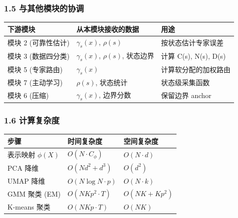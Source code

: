\documentclass[
  12pt,
]{ctexart}
\begin{document}
\subsubsection{1.5
与其他模块的协调}\label{ux4e0eux5176ux4ed6ux6a21ux5757ux7684ux534fux8c03}

\begin{longtable}[]{@{}
  >{\raggedright\arraybackslash}p{}
  >{\raggedright\arraybackslash}p{}
  >{\raggedright\arraybackslash}p{}@{}}
\toprule\noalign{}
\begin{minipage}[b]{\linewidth}\raggedright
下游模块
\end{minipage} & \begin{minipage}[b]{\linewidth}\raggedright
从本模块接收的数据
\end{minipage} & \begin{minipage}[b]{\linewidth}\raggedright
用途
\end{minipage} \\
\midrule\noalign{}
\endhead
\bottomrule\noalign{}
\endlastfoot
模块 2 (可靠性估计) & \(\gamma_s(x)\), \(\rho(s)\) &
按状态估计专家误差 \\
模块 3 (数据四分类) & \(\gamma_s(x)\), \(\rho(s)\), 状态边界 & 计算
C(s), N(s), D(s) \\
模块 5 (专家路由) & \(\gamma_s(x)\) & 计算软分配的加权路由 \\
模块 7 (主动学习) & \(\rho(s)\), 状态统计 & 状态级采集函数 \\
模块 6 (压缩) & \(\gamma_s(x)\), 边界分数 & 保留边界 anchor \\
\end{longtable}

\subsubsection{1.6 计算复杂度}\label{ux8ba1ux7b97ux590dux6742ux5ea6}

\begin{longtable}[]{@{}lll@{}}
\toprule\noalign{}
步骤 & 时间复杂度 & 空间复杂度 \\
\midrule\noalign{}
\endhead
\bottomrule\noalign{}
\endlastfoot
表示映射 \(\phi(X)\) & \(O(N \cdot C_\phi)\) & \(O(N \cdot d)\) \\
PCA 降维 & \(O(N d^2 + d^3)\) & \(O(d^2)\) \\
UMAP 降维 & \(O(N \log N \cdot p)\) & \(O(N \cdot k)\) \\
GMM 聚类 (EM) & \(O(N K p^2 \cdot T)\) & \(O(NK + Kp^2)\) \\
K-means 聚类 & \(O(N K p \cdot T)\) & \(O(NK)\) \\
\end{longtable}
\end{document}
